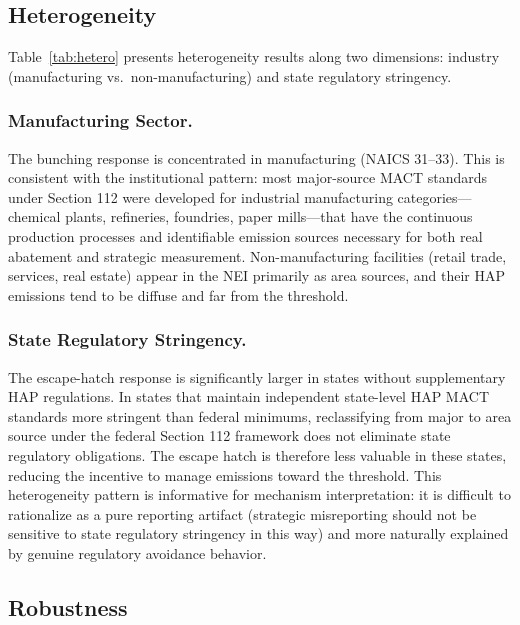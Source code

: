 \documentclass[12pt]{article}
\begin{document}


\subsection{Heterogeneity}

Table~\ref{tab:hetero} presents heterogeneity results along two dimensions: industry (manufacturing vs.\ non-manufacturing) and state regulatory stringency.



\subsubsection*{Manufacturing Sector.}
The bunching response is concentrated in manufacturing (NAICS 31--33). This is consistent with the institutional pattern: most major-source MACT standards under Section 112 were developed for industrial manufacturing categories---chemical plants, refineries, foundries, paper mills---that have the continuous production processes and identifiable emission sources necessary for both real abatement and strategic measurement. Non-manufacturing facilities (retail trade, services, real estate) appear in the NEI primarily as area sources, and their HAP emissions tend to be diffuse and far from the threshold.

\subsubsection*{State Regulatory Stringency.}
The escape-hatch response is significantly larger in states without supplementary HAP regulations. In states that maintain independent state-level HAP MACT standards more stringent than federal minimums, reclassifying from major to area source under the federal Section 112 framework does not eliminate state regulatory obligations. The escape hatch is therefore less valuable in these states, reducing the incentive to manage emissions toward the threshold. This heterogeneity pattern is informative for mechanism interpretation: it is difficult to rationalize as a pure reporting artifact (strategic misreporting should not be sensitive to state regulatory stringency in this way) and more naturally explained by genuine regulatory avoidance behavior.

\subsection{Robustness}
\end{document}
